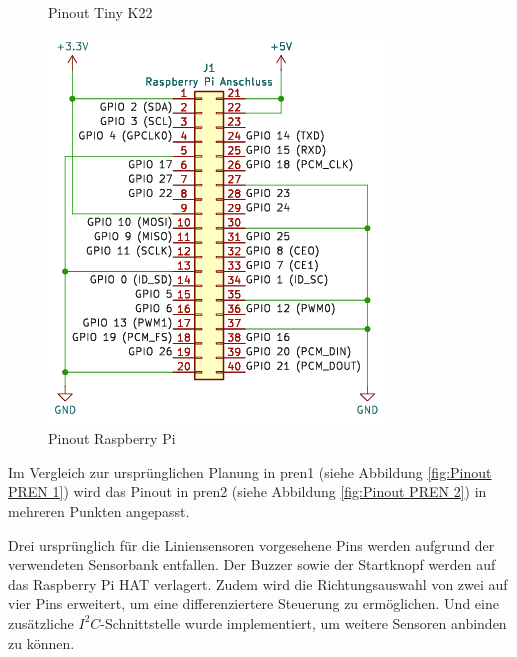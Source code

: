 \begin{figure}[H]
\begin{minipage}[b]{0.45\textwidth}
  \caption{Pinout Tiny K22}
  \label{fig:Pinout TinyK22}
\end{minipage}
\hspace{0.05\textwidth} %
\begin{minipage}[b]{0.45\textwidth}
  \centering
  \includegraphics[width=\textwidth]{assets/ET/Software/RaspyHat_Pinout.png}
  \caption{Pinout Raspberry Pi}
  \label{fig:Pinout Raspy Hat}
\end{minipage}
\end{figure}

Im Vergleich zur ursprünglichen Planung in \acrshort{pren1} (siehe Abbildung \ref{fig:Pinout PREN 1}) wird das Pinout in \acrshort{pren2} (siehe Abbildung \ref{fig:Pinout PREN 2}) in mehreren Punkten angepasst.

Drei ursprünglich für die Liniensensoren vorgesehene Pins werden aufgrund der verwendeten Sensorbank entfallen. Der Buzzer sowie der Startknopf werden auf das Raspberry Pi HAT verlagert. Zudem wird die Richtungsauswahl von zwei auf vier Pins erweitert, um eine differenziertere Steuerung zu ermöglichen. Und eine zusätzliche $I^2C$-Schnittstelle wurde implementiert, um weitere Sensoren anbinden zu können. 


